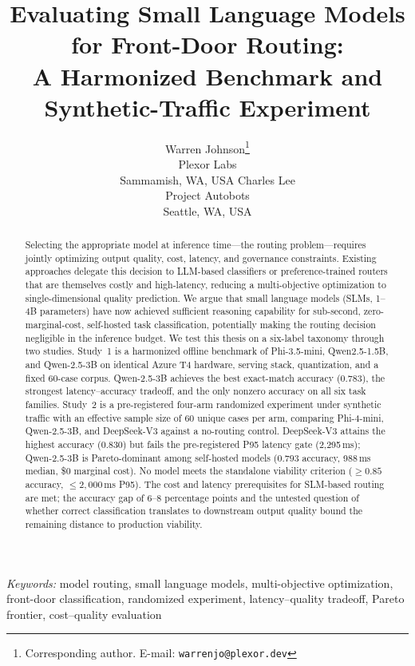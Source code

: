 \documentclass{article}
\title{Evaluating Small Language Models for Front-Door Routing:\\A Harmonized Benchmark and Synthetic-Traffic Experiment}
\author{
  Warren Johnson\thanks{Corresponding author. E-mail: \texttt{warrenjo@plexor.dev}}\\
  Plexor Labs\\
  Sammamish, WA, USA
  \And
  Charles Lee\\
  Project Autobots\\
  Seattle, WA, USA
}
\date{}
\begin{document}
\maketitle

\begin{abstract}
Selecting the appropriate model at inference time---the routing problem---requires jointly optimizing output quality, cost, latency, and governance constraints. Existing approaches delegate this decision to LLM-based classifiers or preference-trained routers that are themselves costly and high-latency, reducing a multi-objective optimization to single-dimensional quality prediction. We argue that small language models (SLMs, 1--4B parameters) have now achieved sufficient reasoning capability for sub-second, zero-marginal-cost, self-hosted task classification, potentially making the routing decision negligible in the inference budget. We test this thesis on a six-label taxonomy through two studies. Study~1 is a harmonized offline benchmark of Phi-3.5-mini, Qwen2.5-1.5B, and Qwen-2.5-3B on identical Azure T4 hardware, serving stack, quantization, and a fixed 60-case corpus. Qwen-2.5-3B achieves the best exact-match accuracy (0.783), the strongest latency--accuracy tradeoff, and the only nonzero accuracy on all six task families. Study~2 is a pre-registered four-arm randomized experiment under synthetic traffic with an effective sample size of 60 unique cases per arm, comparing Phi-4-mini, Qwen-2.5-3B, and DeepSeek-V3 against a no-routing control. DeepSeek-V3 attains the highest accuracy (0.830) but fails the pre-registered P95 latency gate (2,295\,ms); Qwen-2.5-3B is Pareto-dominant among self-hosted models ($0.793$ accuracy, 988\,ms median, \$0 marginal cost). No model meets the standalone viability criterion ($\geq 0.85$ accuracy, $\leq 2{,}000$\,ms P95). The cost and latency prerequisites for SLM-based routing are met; the accuracy gap of 6--8 percentage points and the untested question of whether correct classification translates to downstream output quality bound the remaining distance to production viability.
\end{abstract}

\vspace{0.3em}
\noindent\textit{Keywords:} model routing, small language models, multi-objective optimization, front-door classification, randomized experiment, latency--quality tradeoff, Pareto frontier, cost--quality evaluation
\end{document}

